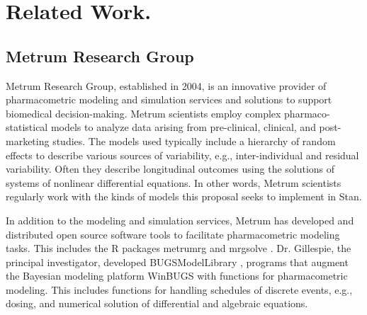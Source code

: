 \documentclass[11pt]{nih2016}
\begin{document}
\section{Related Work.}


\subsection{Metrum Research Group}

Metrum Research Group, established in 2004, is an innovative provider
of pharmacometric modeling and simulation services and solutions to
support biomedical decision-making. Metrum scientists employ complex
pharmaco-statistical models to analyze data arising from pre-clinical,
clinical, and post-marketing studies. The models used typically
include a hierarchy of random effects to describe various sources of
variability, e.g., inter-individual and residual variability. Often
they describe longitudinal outcomes using the solutions of systems of
nonlinear differential equations. In other words, Metrum scientists
regularly work with the kinds of models this proposal seeks to
implement in Stan.

In addition to the modeling and simulation services, Metrum has
developed and distributed open source software tools to facilitate
pharmacometric modeling tasks. This includes the R packages metrumrg
\citep{bergsma-et-al:2013} and mrgsolve
\citep{baron-gastonguay:2015}. Dr. Gillespie, the principal
investigator, developed BUGSModelLibrary
\citep{gillespie-gastonguay:2009}, programs that augment the Bayesian
modeling platform WinBUGS \citep{lunn-et-al:2000} with functions for
pharmacometric modeling. This includes functions for handling
schedules of discrete events, e.g., dosing, and numerical solution of
differential and algebraic equations.
\end{document}
